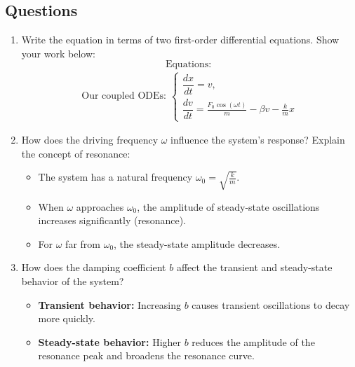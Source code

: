 \documentclass {article}
\begin{document}
\subsection*{Questions}
\begin{enumerate}
    \item Write the equation in terms of two first-order differential equations. Show your work below:
    \[
    \text{Equations: }
    \]
    \begin{equation*}
    \begin{aligned}
    \text{Our coupled ODEs: }
    \begin{cases}
    \dfrac{dx}{dt} = v,\\[6pt]
    \dfrac{dv}{dt} = \frac{F_0 \cos(\omega t)}{m} - \beta v - \frac{k}{m} x
    \end{cases}
    \end{aligned}
    \end{equation*}
    \vspace{0.5cm}
    \item How does the driving frequency $\omega$ influence the system's response? Explain the concept of resonance:
    \begin{itemize}
        \item The system has a natural frequency $\omega_0 = \sqrt{\frac{k}{m}}$.
        \item When $\omega$ approaches $\omega_0$, the amplitude of steady-state oscillations increases significantly (resonance).
        \item For $\omega$ far from $\omega_0$, the steady-state amplitude decreases.
    \end{itemize}
    \vspace{0.5cm}
    \item How does the damping coefficient $b$ affect the transient and steady-state behavior of the system?
    \begin{itemize}
        \item \textbf{Transient behavior:} Increasing $b$ causes transient oscillations to decay more quickly.
        \item \textbf{Steady-state behavior:} Higher $b$ reduces the amplitude of the resonance peak and broadens the resonance curve.
    \end{itemize}
    \vspace{0.5cm}
\end{enumerate}
\end{document}
